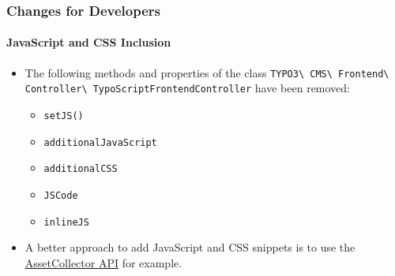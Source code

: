 %

\begin{frame}[fragile]
	\frametitle{Changes for Developers}
	\framesubtitle{JavaScript and CSS Inclusion}


	\begin{itemize}
		\item The following methods and properties of the class
			\small\texttt{TYPO3\textbackslash
				CMS\textbackslash
				Frontend\textbackslash
				Controller\textbackslash
				TypoScriptFrontendController}\normalsize
			have been removed:

			\begin{itemize}
				\item \texttt{setJS()}
				\item \texttt{additionalJavaScript}
				\item \texttt{additionalCSS}
				\item \texttt{JSCode}
				\item \texttt{inlineJS}
			\end{itemize}

		\item A better approach to add JavaScript and CSS snippets is to use the
			\href{https://docs.typo3.org/m/typo3/reference-coreapi/master/en-us/ApiOverview/Assets/Index.html}{AssetCollector API}
			for example.
	\end{itemize}

\end{frame}

